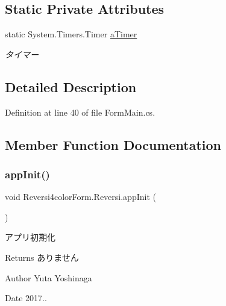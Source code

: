 \subsection*{Static Private Attributes}
\begin{DoxyCompactItemize}
\item 
\mbox{\label{class_reversi4color_form_1_1_reversi_a8b1b696d8d0def6a500168796bb83838}} 
static System.\+Timers.\+Timer \hyperlink{class_reversi4color_form_1_1_reversi_a8b1b696d8d0def6a500168796bb83838}{a\+Timer}
\begin{DoxyCompactList}\small\item\em タイマー \end{DoxyCompactList}\end{DoxyCompactItemize}


\subsection{Detailed Description}


Definition at line 40 of file Form\+Main.\+cs.



\subsection{Member Function Documentation}
\mbox{\label{class_reversi4color_form_1_1_reversi_ab30feb8c247bae6c78fa935456cf909a}} 
\subsubsection{\texorpdfstring{app\+Init()}{appInit()}}
{\footnotesize\ttfamily void Reversi4color\+Form.\+Reversi.\+app\+Init (\begin{DoxyParamCaption}{ }\end{DoxyParamCaption})}



アプリ初期化 

\begin{DoxyReturn}{Returns}
ありません 
\end{DoxyReturn}
\begin{DoxyAuthor}{Author}
Yuta Yoshinaga 
\end{DoxyAuthor}
\begin{DoxyDate}{Date}
2017.. 
\end{DoxyDate}



